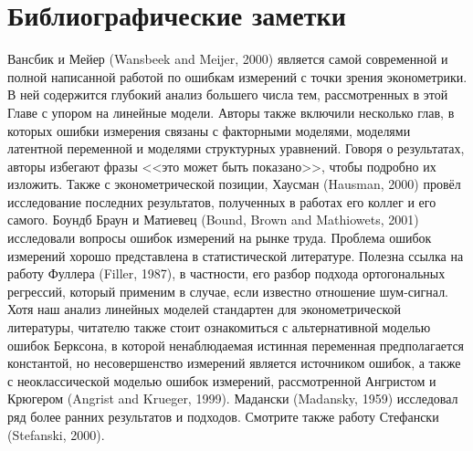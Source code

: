 \section{Библиографические заметки} 
Вансбик и Мейер (Wansbeek and Meijer, 2000) является самой современной и полной написанной работой по ошибкам измерений с точки зрения эконометрики. В ней содержится глубокий анализ большего числа тем, рассмотренных в этой Главе с упором на линейные модели. Авторы также включили несколько глав, в которых ошибки измерения связаны с факторными моделями, моделями латентной переменной и моделями структурных уравнений. Говоря о результатах, авторы избегают фразы <<это может быть показано>>, чтобы подробно их изложить. Также с эконометрической позиции, Хаусман (Hausman, 2000) провёл исследование последних результатов, полученных в работах его коллег и его самого. Боундб Браун и Матиевец (Bound, Brown and Mathiowets, 2001) исследовали вопросы ошибок измерений на рынке труда.
Проблема ошибок измерений хорошо представлена в статистической литературе. Полезна ссылка на работу Фуллера (Filler, 1987), в частности, его разбор подхода ортогональных регрессий, который применим в случае, если известно отношение шум-сигнал. Хотя наш анализ линейных моделей стандартен для эконометрической литературы, читателю также стоит ознакомиться с альтернативной моделью ошибок Берксона, в которой ненаблюдаемая истинная переменная предполагается константой, но несовершенство измерений является источником ошибок, а также с неоклассической моделью ошибок измерений, рассмотренной Ангристом и Крюгером (Angrist and Krueger, 1999). Мадански (Madansky, 1959) исследовал ряд более ранних результатов и подходов. Смотрите также работу Стефански (Stefanski, 2000).
